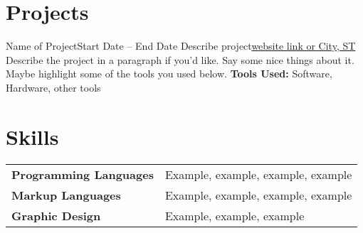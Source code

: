 \documentclass[english]{article}
\begin{document}
\section{Projects}

\entry
{Name of Project}{Start Date -- End Date}
{Describe project}{\href{link_to_project.com}{website link or City, ST}}
{
Describe the project in a paragraph if you'd like.
Say some nice things about it.
Maybe highlight some of the tools you used below.
\textbf{Tools Used:} Software, Hardware, other tools
}


\section{Skills}

\begin{tabular}{ll}
\textbf{Programming Languages} & Example, example, example, example \\
\textbf{Markup Languages} & Example, example, example, example \\
\textbf{Graphic Design} & Example, example, example 
\end{tabular}
\end{document}
